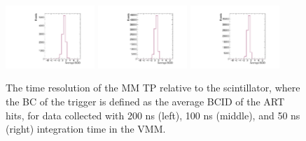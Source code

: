 \begin{figure}[!htpb]
  \begin{center}
    \includegraphics[width=0.3\textwidth]{figures/gbtanalysis3530/avg_BCID.pdf}
    \includegraphics[width=0.3\textwidth]{figures/gbtanalysis3527/avg_BCID.pdf}
    \includegraphics[width=0.3\textwidth]{figures/gbtanalysis3528/avg_BCID.pdf}
  \end{center}
  \vspace{-10pt}
  \caption{The time resolution of the MM TP relative to the scintillator, where the BC of the trigger is defined as the average BCID of the ART hits, for data collected with 200 ns (left), 100 ns (middle), and 50 ns (right) integration time in the VMM.}
  \label{fig:integ_avg_bc}
\end{figure}

